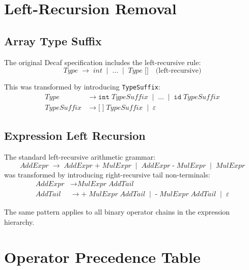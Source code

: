 \documentclass[12pt,a4paper]{article}
\begin{document}
\section{Left-Recursion Removal}

\subsection{Array Type Suffix}

The original Decaf specification includes the left-recursive rule:
\[
  \textit{Type} \;\rightarrow\; \textit{int} \;\mid\; \ldots \;\mid\;
  \textit{Type}\;\texttt{[]}\quad\text{(left-recursive)}
\]

This was transformed by introducing \texttt{TypeSuffix}:
\begin{align*}
  \textit{Type}       &\rightarrow \texttt{int}\;\textit{TypeSuffix}
                         \;\mid\; \ldots \;\mid\;
                         \texttt{id}\;\textit{TypeSuffix}\\
  \textit{TypeSuffix} &\rightarrow \texttt{[}\;\texttt{]}\;\textit{TypeSuffix}
                         \;\mid\; \varepsilon
\end{align*}

\subsection{Expression Left Recursion}

The standard left-recursive arithmetic grammar:
\[
  \textit{AddExpr} \;\rightarrow\; \textit{AddExpr}\;\texttt{+}\;\textit{MulExpr}
  \;\mid\; \textit{AddExpr}\;\texttt{-}\;\textit{MulExpr}
  \;\mid\; \textit{MulExpr}
\]
was transformed by introducing right-recursive tail non-terminals:
\begin{align*}
  \textit{AddExpr} &\rightarrow \textit{MulExpr}\;\textit{AddTail}\\
  \textit{AddTail} &\rightarrow \texttt{+}\;\textit{MulExpr}\;\textit{AddTail}
                      \;\mid\; \texttt{-}\;\textit{MulExpr}\;\textit{AddTail}
                      \;\mid\; \varepsilon
\end{align*}

The same pattern applies to all binary operator chains in the expression hierarchy.

\section{Operator Precedence Table}
\end{document}
